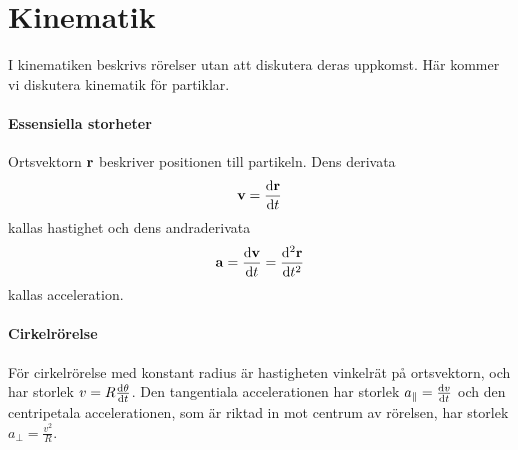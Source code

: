 \section{Kinematik}

I kinematiken beskrivs rörelser utan att diskutera deras uppkomst. Här kommer vi diskutera kinematik för partiklar.

\paragraph{Essensiella storheter}
Ortsvektorn $\vect{r}$ beskriver positionen till partikeln. Dens derivata
\begin{align*}
	\vect{v} = \dv{\vect{r}}{t}
\end{align*}
kallas hastighet och dens andraderivata
\begin{align*}
	\vect{a} = \dv{\vect{v}}{t} = \dv[2]{\vect{r}}{t}
\end{align*}
kallas acceleration.

\paragraph{Cirkelrörelse}
För cirkelrörelse med konstant radius är hastigheten vinkelrät på ortsvektorn, och har storlek $v = R\dv{\theta}{t}$. Den tangentiala accelerationen har storlek $a_{\parallel} = \dv{v}{t}$ och den centripetala accelerationen, som är riktad in mot centrum av rörelsen, har storlek $a_{\perp} = \frac{v^2}{R}$.

